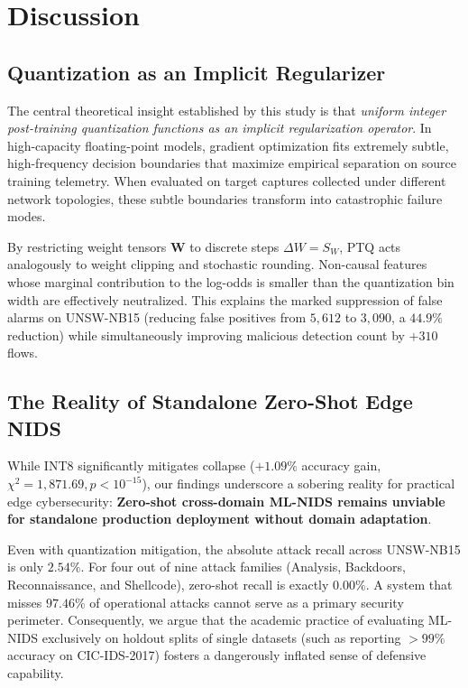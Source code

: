\section{Discussion}
\label{sec:discussion}

\subsection{Quantization as an Implicit Regularizer}
The central theoretical insight established by this study is that \emph{uniform integer post-training quantization functions as an implicit regularization operator}. In high-capacity floating-point models, gradient optimization fits extremely subtle, high-frequency decision boundaries that maximize empirical separation on source training telemetry. When evaluated on target captures collected under different network topologies, these subtle boundaries transform into catastrophic failure modes.

By restricting weight tensors $\mathbf{W}$ to discrete steps $\Delta W = S_W$, PTQ acts analogously to weight clipping and stochastic rounding. Non-causal features whose marginal contribution to the log-odds is smaller than the quantization bin width are effectively neutralized. This explains the marked suppression of false alarms on UNSW-NB15 (reducing false positives from $5,612$ to $3,090$, a $44.9\%$ reduction) while simultaneously improving malicious detection count by $+310$ flows.

\subsection{The Reality of Standalone Zero-Shot Edge NIDS}
While INT8 significantly mitigates collapse ($+1.09\%$ accuracy gain, $\chi^2 = 1,871.69, p < 10^{-15}$), our findings underscore a sobering reality for practical edge cybersecurity: \textbf{Zero-shot cross-domain ML-NIDS remains unviable for standalone production deployment without domain adaptation}.

Even with quantization mitigation, the absolute attack recall across UNSW-NB15 is only $2.54\%$. For four out of nine attack families (Analysis, Backdoors, Reconnaissance, and Shellcode), zero-shot recall is exactly $0.00\%$. A system that misses $97.46\%$ of operational attacks cannot serve as a primary security perimeter. Consequently, we argue that the academic practice of evaluating ML-NIDS exclusively on holdout splits of single datasets (such as reporting $>99\%$ accuracy on CIC-IDS-2017) fosters a dangerously inflated sense of defensive capability.

